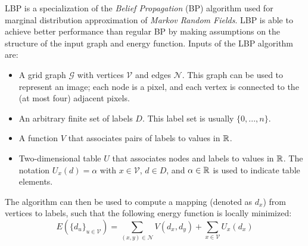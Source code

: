 \documentclass[notitlepage,english]{hgbreport}
\newcommand{\Acronym}[1]{{#1}}
\newcommand{\LBP}{\Acronym{LBP}}
\newcommand{\Vertices}{\mathcal{V}}
\newcommand{\Edges}{\mathcal{N}}
\newcommand{\Graph}{\mathcal{G}}
\begin{document}
\LBP{} is a specialization of the \emph{Belief Propagation} (\Acronym{BP}) algorithm used for {marginal distribution} approximation of \emph{Markov Random Fields}. \LBP{} is able to achieve better performance than regular \Acronym{BP} by making assumptions on the structure of the input graph and energy function.
Inputs of the \LBP{} algorithm are:
\begin{itemize}
	\item A grid graph $\Graph$ with vertices $\Vertices$ and edges $\Edges$. This graph can be used to represent an image; each node is a pixel, and each vertex is connected to the (at  most four) adjacent pixels. 
	\item An arbitrary finite set of labels $D$. This label set is usually $\{0, ... , n\}$.
	\item A function $V$ that associates pairs of labels to values in $\mathbb{R}$.
	\item Two-dimensional table $U$ that associates nodes and labels to values in $\mathbb{R}$. The notation $U_x(d) = \alpha$ with $x\in\Vertices$, $d\in D$, and $\alpha \in \mathbb{R}$ is used to indicate table elements.
\end{itemize}
The algorithm can then be used to compute a mapping (denoted as $d_x$) from vertices to labels, such that the following energy function is locally minimized:
\begin{equation} \label{eq:lbp-example-energy}
E(\{d_u\}_{u\in\Vertices}) = \sum_{(x,y)\in \Edges} V(d_x,d_y) + \sum_{x\in\Vertices} U_x(d_x) 
\end{equation}
\newpage
\end{document}
